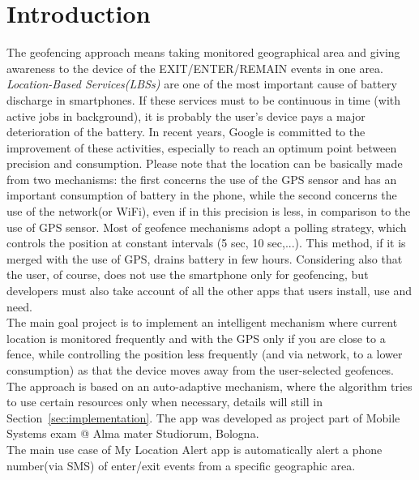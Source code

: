 \documentclass[conference]{IEEEtran}
\begin{document}
\section{Introduction}
The geofencing approach means taking monitored geographical area and giving awareness to the device of the EXIT/ENTER/REMAIN events in one area.
\textit{Location-Based Services(LBSs)} are one of the most important cause of battery discharge in smartphones.
If these services must to be continuous in time (with active jobs in background), it is probably the user's device pays a major deterioration of the battery.
In recent years, Google is committed to the improvement of these activities, especially to reach an optimum point between precision and consumption.
Please note that the location can be basically made from two mechanisms:
the first concerns the use of the GPS sensor and has an important consumption of battery in the phone, while the second concerns the use of the network(or WiFi), 
even if in this precision is less, in comparison to the use of GPS sensor.
Most of geofence mechanisms adopt a polling strategy, which controls the position at constant intervals (5 sec, 10 sec,...). 
This method, if it is merged with the use of GPS, drains battery in few hours. 
Considering also that the user, of course, does not use the smartphone only for geofencing, but developers must also take account of all the other apps that users install, use and need.\\
The main goal project is to implement an intelligent mechanism where current location is monitored frequently and with the GPS only if you are close to a fence, 
while controlling the position less frequently (and via network, to a lower consumption) as that the device moves away from the user-selected geofences.
The approach is based on an auto-adaptive mechanism, where the algorithm tries to use certain resources only when necessary, details will still in Section~\ref{sec:implementation}.
The app was developed as project part of Mobile Systems exam @ Alma mater Studiorum, Bologna.\\
The main use case of My Location Alert app is automatically alert a phone number(via SMS) of enter/exit events from a specific geographic area. 
\end{document}

